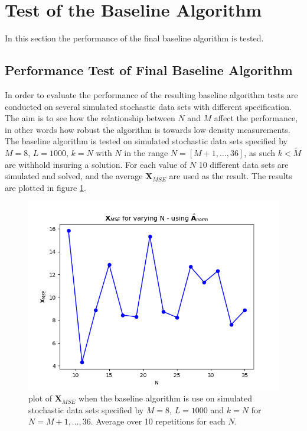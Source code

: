 \section{Test of the Baseline Algorithm}\label{sec:test_base}
In this section the performance of the final baseline algorithm is tested.  
 
  

\subsection{Performance Test of Final Baseline Algorithm}
In order to evaluate the performance of the resulting baseline algorithm tests are conducted on several simulated stochastic data sets with different specification. The aim is to see how the relationship between $N$ and $M$ affect the performance, in other words how robust the algorithm is towards low density measurements. 
The baseline algorithm is tested on simulated stochastic data sets specified by $M=8$, $L=1000$, $k=N$ with $N$ in the range $N = [M+1,\hdots,36]$, as such $k<\widetilde{M}$ are withhold insuring a solution.
For each value of $N$ 10 different data sets are simulated and solved, and the average $\textbf{X}_{MSE}$ are used as the result. 
The results are plotted in figure \ref{fig:varyN1}.
      
\begin{figure}[H]
    \centering
	\includegraphics[scale=0.5]{figures/ch_6/varyN1.png}
	\caption{ plot of $\textbf{X}_{MSE}$ when the baseline algorithm is use on simulated stochastic data sets specified by $M = 8$, $L=1000$ and $k = N$ for $N = M+1, \hdots , 36$. Average over 10 repetitions for each $N$.}
	\label{fig:varyN1}
\end{figure}

